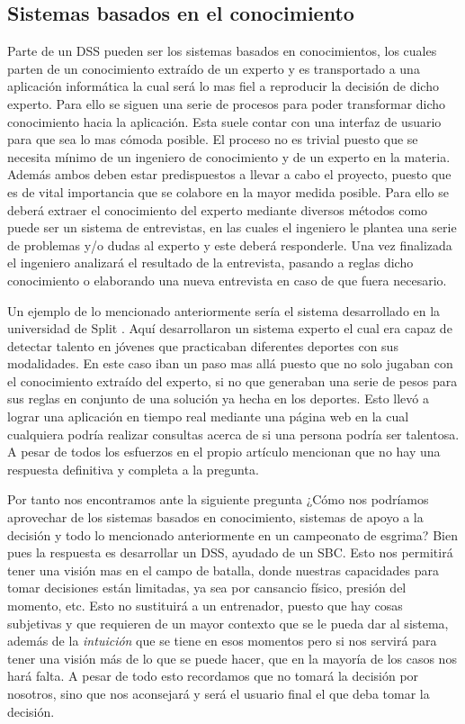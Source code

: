\subsection{Sistemas basados en el conocimiento}

Parte de un \acs{DSS} pueden ser los sistemas basados en conocimientos, los cuales parten de un conocimiento extraído de un
 experto y es transportado a una aplicación informática la cual será lo mas fiel a reproducir
 la decisión de dicho experto. Para ello se siguen una serie de procesos para poder transformar
 dicho conocimiento hacia la aplicación. Esta suele contar con una interfaz de usuario para que
 sea lo mas cómoda posible. El proceso no es trivial puesto que se necesita mínimo
 de un ingeniero de conocimiento y de un experto en la materia. Además ambos deben estar predispuestos
 a llevar a cabo el proyecto, puesto que es de vital importancia que se colabore en la mayor
 medida posible. Para ello se deberá extraer el conocimiento del experto mediante diversos métodos
 como puede ser un sistema de entrevistas, en las cuales el ingeniero le plantea una serie
 de problemas y/o dudas al experto y este deberá responderle. Una vez finalizada el ingeniero
 analizará el resultado de la entrevista, pasando a reglas dicho conocimiento o elaborando
 una nueva entrevista en caso de que fuera necesario.

Un ejemplo de lo mencionado anteriormente sería el sistema desarrollado en la universidad de Split \cite{sportTalent}.
 Aquí desarrollaron un sistema experto el cual era capaz de detectar talento en jóvenes que
 practicaban diferentes deportes con sus modalidades. En este caso iban un paso mas allá puesto
 que no solo jugaban con el conocimiento extraído del experto, si no que generaban una serie de
 pesos para sus reglas en conjunto de una solución ya hecha en los deportes. Esto llevó a lograr
 una aplicación en tiempo real mediante una página web en la cual cualquiera podría realizar consultas
 acerca de si una persona podría ser talentosa. A pesar de todos los esfuerzos en el propio artículo
 mencionan que no hay una respuesta definitiva y completa a la pregunta.

Por tanto nos encontramos ante la siguiente pregunta ¿Cómo nos podríamos aprovechar de los
 sistemas basados en conocimiento, sistemas de apoyo a la decisión y todo lo mencionado
 anteriormente en un campeonato de esgrima? Bien pues la respuesta es desarrollar un \acs{DSS}, ayudado de un \acs{SBC}. Esto nos permitirá tener una
 visión mas en el campo de batalla, donde
 nuestras capacidades para tomar decisiones están limitadas, ya sea por cansancio físico, presión del
 momento, etc. Esto no sustituirá a un entrenador, puesto que hay cosas subjetivas y que requieren
 de un mayor contexto que se le pueda dar al sistema, además de la \textit{intuición} que se tiene en esos momentos
 pero si nos servirá para tener una visión más de lo que se puede hacer, que en la mayoría de los
 casos nos hará falta. A pesar de todo esto recordamos que no tomará la decisión por nosotros,
 sino que nos aconsejará y será el usuario final el que deba tomar la decisión.

